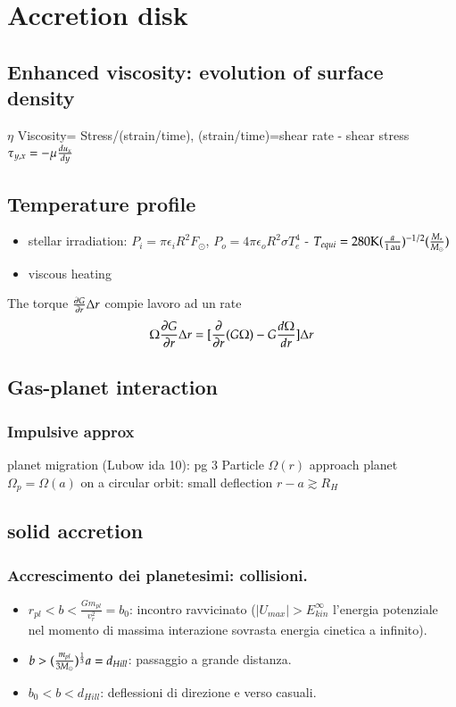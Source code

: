 \documentclass[main.tex]{subfiles}
\begin{document}
\chapter{Accretion disk}

\section{Enhanced viscosity: evolution of surface density}

$\eta$ Viscosity= Stress/(strain/time), (strain/time)=shear rate - shear stress $\tau_{y,x}=-\mu\TDy{y}{u_x}$

\section{Temperature profile}
\begin{itemize}
\item stellar irradiation: $P_i=\pi\epsilon_iR^2F_{\odot}$, $P_o=4\pi\epsilon_oR^2\sigma T_e^4$ - $T_{equi}=280\si{\kelvin}(\frac{a}{\SI{1}{\astronomicalunit}})^{-1/2}(\frac{M_*}{\msun})$
\item viscous heating
\end{itemize}
The torque $\PDy{r}{G}\Delta r$ compie lavoro  ad un rate
\begin{equation*}
\Omega\PDy{r}{G}\Delta r=[\PDof{r}(G\Omega)-G\TDy{r}{\Omega}]\Delta r
\end{equation*}


\section{Gas-planet interaction}
 
\subsection{Impulsive approx}

planet migration (Lubow ida 10): pg 3
Particle $\Omega(r)$ approach planet $\Omega_p=\Omega(a)$ on a circular orbit: small deflection $r-a\gtrsim R_H$
 


\section{solid accretion}

\subsection{Accrescimento dei planetesimi: collisioni.}
\begin{itemize}
\item $r_{pl}<b<\frac{Gm_{pl}}{v_r^2}=b_0$: incontro ravvicinato ($|U_{max}|>E_{kin}^{\infty}$ l'energia potenziale nel momento di massima interazione sovrasta energia cinetica a infinito).
\item $b>(\frac{m_{pl}}{3\msun{}})\expy{\frac{1}{3}}a=d_{Hill}$: passaggio a grande distanza.
\item $b_0<b<d_{Hill}$: deflessioni di direzione e verso casuali.
\end{itemize}
\end{document}
